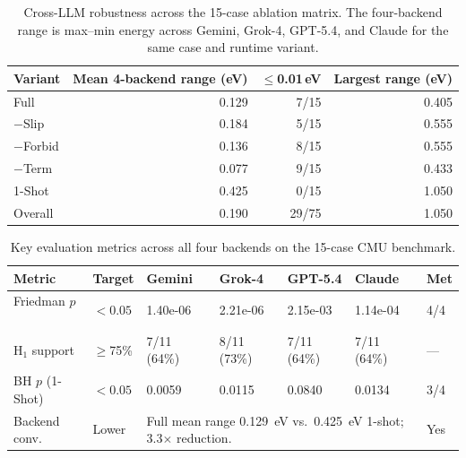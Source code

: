 \begin{table}[t]
\centering
\caption{Cross-LLM robustness across the 15-case ablation matrix. The four-backend range is max--min energy across Gemini, Grok-4, GPT-5.4, and Claude for the same case and runtime variant.}
\label{tab:cross-llm-summary}
\begin{tabular}{lrrr}
\toprule
Variant & Mean 4-backend range (eV) & $\leq$0.01\,eV & Largest range (eV) \\
\midrule
Full & 0.129 & 7/15 & 0.405 \\
$-$Slip & 0.184 & 5/15 & 0.555 \\
$-$Forbid & 0.136 & 8/15 & 0.555 \\
$-$Term & 0.077 & 9/15 & 0.433 \\
1-Shot & 0.425 & 0/15 & 1.050 \\
\midrule
Overall & 0.190 & 29/75 & 1.050 \\
\bottomrule
\end{tabular}
\end{table}

\begin{table}[t]
\centering
\caption{Key evaluation metrics across all four backends on the 15-case CMU benchmark.}
\label{tab:key-evaluation-metrics}
\begin{tabular}{p{2.8cm}p{1.3cm}p{1.8cm}p{1.8cm}p{1.8cm}p{1.8cm}p{1.0cm}}
\toprule
Metric & Target & Gemini & Grok-4 & GPT-5.4 & Claude & Met \\
\midrule
Friedman $p$~\cite{friedman1937use} & $< 0.05$ & 1.40e-06 & 2.21e-06 & 2.15e-03 & 1.14e-04 & 4/4 \\
H$_1$ support & $\geq$75\% & 7/11 (64\%) & 8/11 (73\%) & 7/11 (64\%) & 7/11 (64\%) & --- \\
BH $p$ (1-Shot)~\cite{benjamini1995controlling} & $< 0.05$ & 0.0059 & 0.0115 & 0.0840 & 0.0134 & 3/4 \\
Backend conv. & Lower & \multicolumn{4}{p{7.2cm}}{Full mean range 0.129~eV vs.\ 0.425~eV 1-shot; 3.3$\times$ reduction.} & Yes \\
\bottomrule
\end{tabular}
\end{table}

